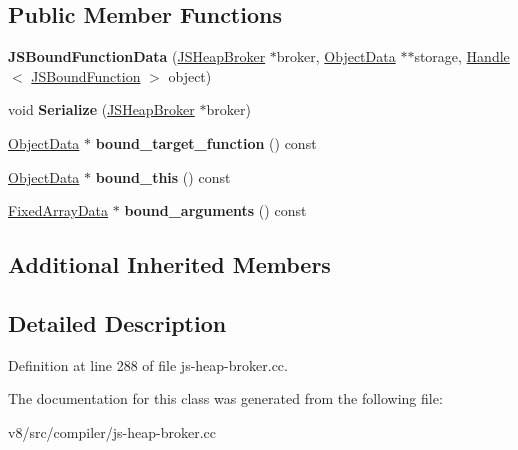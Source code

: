 \subsection*{Public Member Functions}
\begin{DoxyCompactItemize}
\item 
\mbox{\label{classv8_1_1internal_1_1compiler_1_1JSBoundFunctionData_ac4a4cb52713ad854db54df75d40209d1}} 
{\bfseries J\+S\+Bound\+Function\+Data} (\mbox{\hyperlink{classv8_1_1internal_1_1compiler_1_1JSHeapBroker}{J\+S\+Heap\+Broker}} $\ast$broker, \mbox{\hyperlink{classv8_1_1internal_1_1compiler_1_1ObjectData}{Object\+Data}} $\ast$$\ast$storage, \mbox{\hyperlink{classv8_1_1internal_1_1Handle}{Handle}}$<$ \mbox{\hyperlink{classv8_1_1internal_1_1JSBoundFunction}{J\+S\+Bound\+Function}} $>$ object)
\item 
\mbox{\label{classv8_1_1internal_1_1compiler_1_1JSBoundFunctionData_ae55ea160201b7db168c9c57d8cd85bff}} 
void {\bfseries Serialize} (\mbox{\hyperlink{classv8_1_1internal_1_1compiler_1_1JSHeapBroker}{J\+S\+Heap\+Broker}} $\ast$broker)
\item 
\mbox{\label{classv8_1_1internal_1_1compiler_1_1JSBoundFunctionData_acad4a4b75e128609876a09b4fa6c85df}} 
\mbox{\hyperlink{classv8_1_1internal_1_1compiler_1_1ObjectData}{Object\+Data}} $\ast$ {\bfseries bound\+\_\+target\+\_\+function} () const
\item 
\mbox{\label{classv8_1_1internal_1_1compiler_1_1JSBoundFunctionData_a4f86b7796a8644244e5b65354b106136}} 
\mbox{\hyperlink{classv8_1_1internal_1_1compiler_1_1ObjectData}{Object\+Data}} $\ast$ {\bfseries bound\+\_\+this} () const
\item 
\mbox{\label{classv8_1_1internal_1_1compiler_1_1JSBoundFunctionData_a6ffbfaa5d24d70ca9d3ae251502bf8ac}} 
\mbox{\hyperlink{classv8_1_1internal_1_1compiler_1_1FixedArrayData}{Fixed\+Array\+Data}} $\ast$ {\bfseries bound\+\_\+arguments} () const
\end{DoxyCompactItemize}
\subsection*{Additional Inherited Members}


\subsection{Detailed Description}


Definition at line 288 of file js-\/heap-\/broker.\+cc.



The documentation for this class was generated from the following file\+:\begin{DoxyCompactItemize}
\item 
v8/src/compiler/js-\/heap-\/broker.\+cc\end{DoxyCompactItemize}
